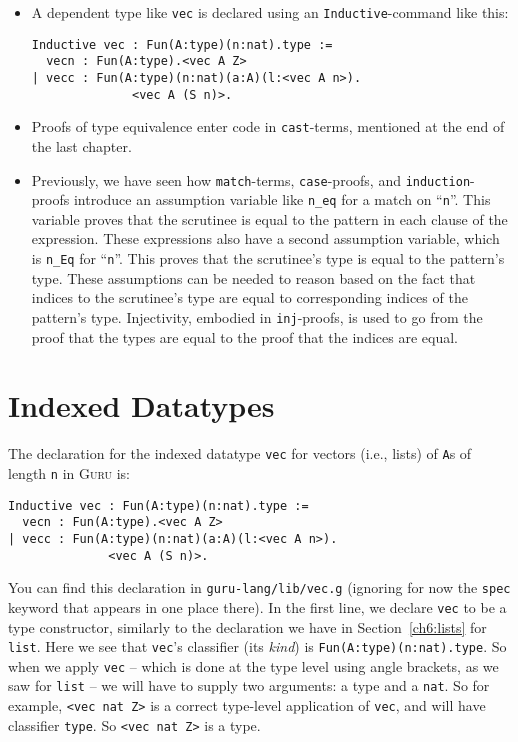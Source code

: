 \documentclass{book}[12pt]
\newcommand{\guru}[0]{\textsc{Guru}\xspace}
\begin{document}
\begin{itemize}
\item A dependent type like \texttt{vec} is declared using an \texttt{Inductive}-command like this:
\begin{verbatim}
Inductive vec : Fun(A:type)(n:nat).type :=
  vecn : Fun(A:type).<vec A Z>
| vecc : Fun(A:type)(n:nat)(a:A)(l:<vec A n>).
              <vec A (S n)>.
\end{verbatim}

\item Proofs of type equivalence enter code in \texttt{cast}-terms, mentioned at the end
of the last chapter.

\item Previously, we have seen how \texttt{match}-terms,
\texttt{case}-proofs, and \texttt{induction}-proofs introduce an
assumption variable like \texttt{n\_eq} for a match on ``\texttt{n}''.
This variable proves that the scrutinee is equal to the pattern in
each clause of the expression.  These expressions also have a second
assumption variable, which is \texttt{n\_Eq} for ``\texttt{n}''.  This
proves that the scrutinee's type is equal to the pattern's type.
These assumptions can be needed to reason based on the fact that
indices to the scrutinee's type are equal to corresponding indices of
the pattern's type.  Injectivity, embodied in \texttt{inj}-proofs, is
used to go from the proof that the types are equal to the proof that
the indices are equal.

\end{itemize}

\section{Indexed Datatypes}

The declaration for the indexed datatype \texttt{vec} for vectors
(i.e., lists) of \texttt{A}s of length \texttt{n} in \guru is:

\begin{verbatim}
Inductive vec : Fun(A:type)(n:nat).type :=
  vecn : Fun(A:type).<vec A Z>
| vecc : Fun(A:type)(n:nat)(a:A)(l:<vec A n>).
              <vec A (S n)>.
\end{verbatim}

\noindent You can find this declaration in
\texttt{guru-lang/lib/vec.g} (ignoring for now the \texttt{spec}
keyword that appears in one place there).  In the first line, we
declare \texttt{vec} to be a type constructor, similarly to the
declaration we have in Section~\ref{ch6:lists} for \texttt{list}.
Here we see that \texttt{vec}'s classifier (its \emph{kind}) is
\texttt{Fun(A:type)(n:nat).type}.  So when we apply \texttt{vec} --
which is done at the type level using angle brackets, as we saw for
\texttt{list} -- we will have to supply two arguments: a type and a
\texttt{nat}.  So for example, \texttt{<vec nat Z>} is a correct
type-level application of \texttt{vec}, and will have classifier
\texttt{type}.  So \texttt{<vec nat Z>} is a type.
\end{document}
